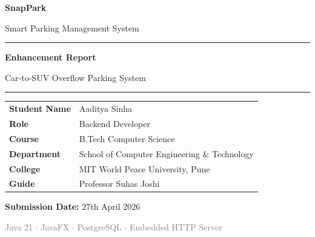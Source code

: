 \documentclass[12pt,a4paper]{article}
\begin{document}
\begin{titlepage}
    \centering
    \vspace*{2cm}
    
    {\Huge\bfseries\textcolor{snapblue}{SnapPark}\par}
    \vspace{0.3cm}
    {\Large\textcolor{snapcyan}{Smart Parking Management System}\par}
    
    \vspace{1.5cm}
    \rule{\textwidth}{1.5pt}
    \vspace{0.5cm}
    
    {\LARGE\bfseries Enhancement Report\par}
    \vspace{0.3cm}
    {\Large\textcolor{snapblue}{Car-to-SUV Overflow Parking System}\par}
    
    \vspace{0.5cm}
    \rule{\textwidth}{1.5pt}
    
    \vspace{2cm}
    
    \begin{tabular}{ll}
        \textbf{Student Name}    & Aaditya Sinha \\
        \textbf{Role}            & Backend Developer \\
        \textbf{Course}          & B.Tech Computer Science \\
        \textbf{Department}      & School of Computer Engineering \& Technology \\
        \textbf{College}         & MIT World Peace University, Pune \\
        \textbf{Guide}           & Professor Suhas Joshi \\
    \end{tabular}
    
    \vspace{2cm}
    
    {\large\textbf{Submission Date:} 27th April 2026\par}
    
    \vfill
    {\small\textcolor{gray}{Java 21 $\cdot$ JavaFX $\cdot$ PostgreSQL $\cdot$ Embedded HTTP Server}\par}
\end{titlepage}
\end{document}
